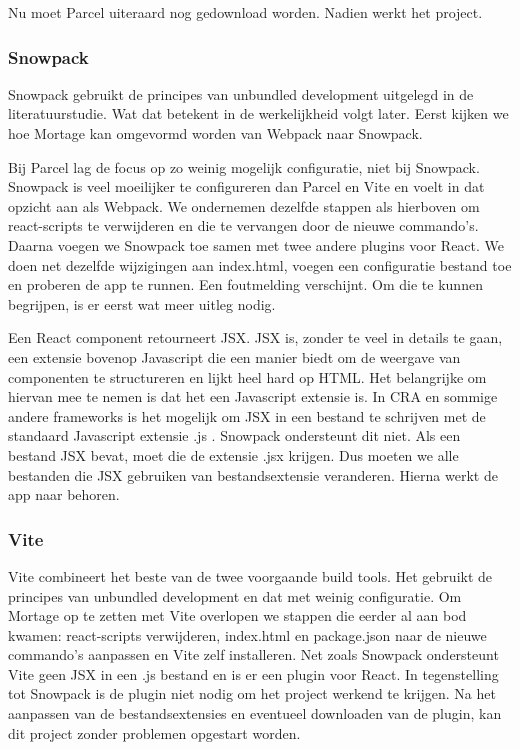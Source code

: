 

Nu moet Parcel uiteraard nog gedownload worden. Nadien werkt het project. 

\subsubsection{Snowpack}
Snowpack gebruikt de principes van unbundled development uitgelegd in de literatuurstudie. Wat dat betekent in de werkelijkheid volgt later. Eerst kijken we hoe Mortage kan omgevormd worden van Webpack naar Snowpack. 

Bij Parcel lag de focus op zo weinig mogelijk configuratie, niet bij Snowpack. Snowpack is veel moeilijker te configureren dan Parcel en Vite en voelt in dat opzicht aan als Webpack. We ondernemen dezelfde stappen als hierboven om react-scripts te verwijderen en die te vervangen door de nieuwe commando’s. Daarna voegen we Snowpack toe samen met twee andere plugins voor React. We doen net dezelfde wijzigingen aan index.html, voegen een configuratie bestand toe en proberen de app te runnen. Een foutmelding verschijnt. Om die te kunnen begrijpen, is er eerst wat meer uitleg nodig.

Een React component retourneert JSX. JSX is, zonder te veel in details te gaan, een extensie bovenop Javascript die een manier biedt om de weergave van componenten te structureren en lijkt heel hard op HTML. Het belangrijke om hiervan mee te nemen is dat het een Javascript extensie is. In CRA en sommige andere frameworks is het mogelijk om JSX in een bestand te schrijven met de standaard Javascript extensie .js . Snowpack ondersteunt dit niet. Als een bestand JSX bevat, moet die de extensie .jsx krijgen. Dus moeten we alle bestanden die JSX gebruiken van bestandsextensie veranderen. Hierna werkt de app naar behoren. 

\subsubsection{Vite}

Vite combineert het beste van de twee voorgaande build tools. Het gebruikt de principes van unbundled development en dat met weinig configuratie. Om Mortage op te zetten met Vite overlopen we stappen die eerder al aan bod kwamen: react-scripts verwijderen, index.html en package.json naar de nieuwe commando’s aanpassen en Vite zelf installeren. Net zoals Snowpack ondersteunt Vite geen JSX in een .js bestand en is er een plugin voor React. In tegenstelling tot Snowpack is de plugin niet nodig om het project werkend te krijgen. Na het aanpassen van de bestandsextensies en eventueel downloaden van de plugin, kan dit project zonder problemen opgestart worden. 

